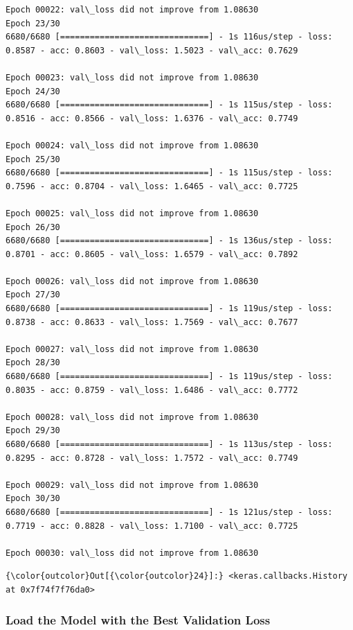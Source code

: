 \documentclass[11pt]{article}
\begin{document}
\begin{Verbatim}[commandchars=\\\{\}]
Epoch 00022: val\_loss did not improve from 1.08630
Epoch 23/30
6680/6680 [==============================] - 1s 116us/step - loss: 0.8587 - acc: 0.8603 - val\_loss: 1.5023 - val\_acc: 0.7629

Epoch 00023: val\_loss did not improve from 1.08630
Epoch 24/30
6680/6680 [==============================] - 1s 115us/step - loss: 0.8516 - acc: 0.8566 - val\_loss: 1.6376 - val\_acc: 0.7749

Epoch 00024: val\_loss did not improve from 1.08630
Epoch 25/30
6680/6680 [==============================] - 1s 115us/step - loss: 0.7596 - acc: 0.8704 - val\_loss: 1.6465 - val\_acc: 0.7725

Epoch 00025: val\_loss did not improve from 1.08630
Epoch 26/30
6680/6680 [==============================] - 1s 136us/step - loss: 0.8701 - acc: 0.8605 - val\_loss: 1.6579 - val\_acc: 0.7892

Epoch 00026: val\_loss did not improve from 1.08630
Epoch 27/30
6680/6680 [==============================] - 1s 119us/step - loss: 0.8738 - acc: 0.8633 - val\_loss: 1.7569 - val\_acc: 0.7677

Epoch 00027: val\_loss did not improve from 1.08630
Epoch 28/30
6680/6680 [==============================] - 1s 119us/step - loss: 0.8035 - acc: 0.8759 - val\_loss: 1.6486 - val\_acc: 0.7772

Epoch 00028: val\_loss did not improve from 1.08630
Epoch 29/30
6680/6680 [==============================] - 1s 113us/step - loss: 0.8295 - acc: 0.8728 - val\_loss: 1.7572 - val\_acc: 0.7749

Epoch 00029: val\_loss did not improve from 1.08630
Epoch 30/30
6680/6680 [==============================] - 1s 121us/step - loss: 0.7719 - acc: 0.8828 - val\_loss: 1.7100 - val\_acc: 0.7725

Epoch 00030: val\_loss did not improve from 1.08630

    \end{Verbatim}

\begin{Verbatim}[commandchars=\\\{\}]
{\color{outcolor}Out[{\color{outcolor}24}]:} <keras.callbacks.History at 0x7f74f7f76da0>
\end{Verbatim}
            
    \subsubsection{Load the Model with the Best Validation
Loss}\label{load-the-model-with-the-best-validation-loss}
\end{document}
